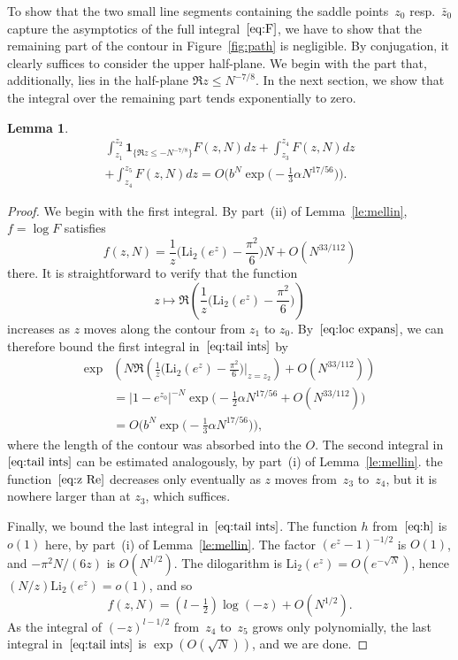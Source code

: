 \documentclass[a4paper]{amsart}
\newtheorem{lemma}[theorem]{Lemma}
\begin{document}
To show that the two small line segments containing the saddle points~$z_0$
resp.~$\bar{z}_0$ capture
the asymptotics of the full integral~$\ref{eq:F}$,
we have to show that the remaining part of the contour in Figure~\ref{fig:path}
is negligible. 
By conjugation, it clearly suffices to consider
the upper half-plane.
We begin with the part that, additionally, lies
in the half-plane $\Re z \leq N^{-7/8}$. In the next section,
we show that the integral over the remaining part tends exponentially to zero.

\begin{lemma}\label{le:tail}
  \begin{multline}\label{eq:tail ints}
     \int_{z_1}^{z_2} \mathbf{1}_{\{\Re z \leq -N^{-7/8}\}}F(z,N) dz
     + \int_{z_3}^{z_4}F(z,N) dz \\
+ \int_{z_4}^{z_5}F(z,N)dz = O\Big(b^N \exp\Big( -\tfrac13 \alpha N^{17/56} \Big)\Big).
  \end{multline}
\end{lemma}
\begin{proof}
  We begin with the first integral. By part~(ii)
  of Lemma~\ref{le:mellin}, $f=\log F$ satisfies
  \[
    f(z,N) = \frac{1}{z}\Big( \mathrm{Li}_2(e^z) - \frac{\pi^2}{6}\Big)N
      + O(N^{33/112})
  \]
  there. It is straightforward to verify that the function
  \begin{equation}\label{eq:z Re}
   z\mapsto \Re\left(
  \frac{1}{z}\Big( \mathrm{Li}_2(e^z) - \frac{\pi^2}{6}\Big)\right)
  \end{equation}
  increases as $z$ moves along the contour from $z_1$ to $z_0$.
  By~$\ref{eq:loc expans}$, we can therefore bound the first integral in~$\ref{eq:tail ints}$ by 
  \begin{align*}
    \exp &\left(    N \Re \left(     \frac{1}{z}
    \Big(     \mathrm{Li}_2(e^z) - \frac{\pi^2}{6}  \Big)
    \Big|_{z=z_2}
    \right) 
    + O(N^{33/112})  \right)    \\
    &= |1-e^{z_0}|^{-N} \exp\Big( -\tfrac12 \alpha N^{17/56} + O(N^{33/112})\Big) \\
    &=   O\Big(b^N \exp\Big( -\tfrac13 \alpha N^{17/56} \Big)\Big),
  \end{align*}
  where the length of the contour was absorbed into the $O$.
  The second integral in~$\ref{eq:tail ints}$ can be estimated analogously,
   by part~(i) of Lemma~\ref{le:mellin}.
  the function~$\ref{eq:z Re}$ decreases only eventually as $z$ moves
  from~$z_3$ to~$z_4$, but it is nowhere larger than at $z_3$, which suffices.

  Finally, we bound the last integral in~$\ref{eq:tail ints}$. The function
  $h$ from~$\ref{eq:h}$ is $o(1)$ here, by part~(i) of Lemma~\ref{le:mellin}. 
  The factor $(e^z-1)^{-1/2}$ is $O(1)$, and $-\pi^2N/(6z)$ is
  $O(N^{1/2})$. The dilogarithm is $\mathrm{Li}_2(e^z) = O(e^{-\sqrt{N}})$,
  hence $(N/z)\mathrm{Li}_2(e^z) =  o(1)$,  and so
  \[
     f(z,N) = (l-\tfrac12)\log(-z) +O(N^{1/2}).
  \]
  As the integral of $(-z)^{l-1/2}$ from~$z_4$ to~$z_5$ grows only
  polynomially, the last integral in~$\ref{eq:tail ints}$
  is $\exp(O(\sqrt{N}))$, and we are done.
\end{proof}
\end{document}
